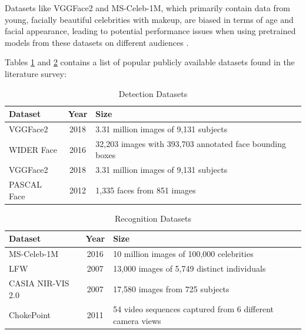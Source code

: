 Datasets like VGGFace2 and MS-Celeb-1M, which primarily contain data from young, facially beautiful celebrities with makeup, are biased in terms of age and facial appearance, leading to potential performance issues when using pretrained models from these datasets on different audiences \cite{wanyonyi_open-source_2022}.

Tables \ref{det-ds} and \ref{rec-ds} contains a list of popular publicly available datasets found in the literature survey:

\begin{table}[htbp]
\caption{Detection Datasets}
\begin{center}
\begin{tabularx}{\columnwidth}{|X|c|X|}
\hline
\textbf{Dataset} & \textbf{Year}& \textbf{Size} \\
\hline
VGGFace2 \cite{kim_face_2022} & 2018 & 3.31 million images of 9,131 subjects \\
\hline
WIDER Face \cite{kim_face_2022} & 2016 & 32,203 images with 393,703 annotated face bounding boxes \\
\hline
VGGFace2 \cite{kim_face_2022} & 2018 & 3.31 million images of 9,131 subjects \\
\hline
PASCAL Face \cite{feng_detect_2022} & 2012 & 1,335 faces from 851 images \\
\hline
\end{tabularx}
\label{det-ds}
\end{center}
\end{table}
    
    
\begin{table}[htbp]
\caption{Recognition Datasets}
\begin{center}
\begin{tabularx}{\columnwidth}{|X|c|X|}
\hline
\textbf{Dataset} & \textbf{Year}& \textbf{Size} \\
\hline
MS-Celeb-1M \cite{wanyonyi_open-source_2022} & 2016 & 10 million images of 100,000 celebrities \\
\hline
LFW \cite{kim_face_2022} & 2007 & 13,000 images of 5,749 distinct individuals \\
\hline
CASIA NIR-VIS 2.0 \cite{liu_heterogeneous_2022} & 2007 & 17,580 images from 725 subjects \\
\hline
ChokePoint \cite{barquero_rank-based_2021} & 2011 & 54 video sequences captured from 6 different camera views \\
\hline
\end{tabularx}
\label{rec-ds}
\end{center}
\end{table}

